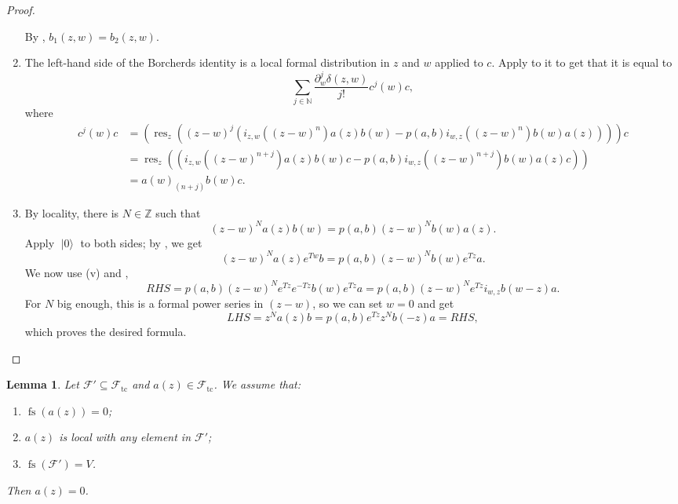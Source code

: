 \documentclass[a4paper, 12pt, reqno]{amsart}
\newtheorem{lemma}[theorem]{Lemma}
\theoremstyle{remark}
\DeclareMathOperator{\res}{res}
\DeclareMathOperator{\vac}{|0\rangle}
\DeclareMathOperator{\fs}{fs}
\DeclareMathOperator{\tc}{tc}
\begin{document}
\begin{proof}
\begin{enumerate}
    By , $b_1(z, w) = b_2(z, w)$.
  \item The left-hand side of the Borcherds identity is a local formal distribution in $z$ and $w$ applied to $c$.
    Apply  to it to get that it is equal to
    \begin{equation*}
      \sum_{j \in \mathbb{N}}\frac{\partial^j_w\delta(z,w)}{j!}c^j(w)c,
    \end{equation*}
    where
    \begin{align*}
      c^j(w)c &= (\res_z((z - w)^j(i_{z, w}((z - w)^n)a(z)b(w) - p(a, b)i_{w, z}((z - w)^n)b(w)a(z))))c \\
              &= \res_z((i_{z, w}((z - w)^{n + j})a(z)b(w)c - p(a, b)i_{w, z}((z - w)^{n + j})b(w)a(z)c)) \\
              &= a(w)_{(n + j)}b(w)c.
    \end{align*}
  \item By locality, there is $N \in \mathbb{Z}$ such that
    \begin{equation*}
      (z - w)^Na(z)b(w) = p(a, b)(z - w)^Nb(w)a(z).
    \end{equation*}
    Apply $\vac$ to both sides; by , we get
    \begin{equation*}
      (z - w)^Na(z)e^{Tw}b = p(a, b)(z - w)^Nb(w)e^{Tz}a.
    \end{equation*}
    We now use (v) and ,
    \begin{equation*}
      RHS = p(a, b)(z - w)^Ne^{Tz}e^{-Tz}b(w)e^{Tz}a = p(a, b)(z - w)^Ne^{Tz}i_{w, z}b(w - z)a.
    \end{equation*}
    For $N$ big enough, this is a formal power series in $(z - w)$, so we can set $w = 0$ and get
    \begin{equation*}
      LHS = z^Na(z)b = p(a, b)e^{Tz}z^Nb(-z)a = RHS,
    \end{equation*}
    which proves the desired formula. \qedhere
  \end{enumerate}
\end{proof}

\begin{lemma}
  \label{lmm:7}
  Let $\mathcal{F}' \subseteq \mathcal{F}_{\tc}$ and $a(z) \in \mathcal{F}_{\tc}$.
  We assume that:
  \begin{enumerate}
  \item $\fs(a(z)) = 0$;
  \item $a(z)$ is local with any element in $\mathcal{F}'$;
  \item $\fs(\mathcal{F}') = V$.
  \end{enumerate}
  Then $a(z) = 0$.
\end{lemma}
\end{document}
